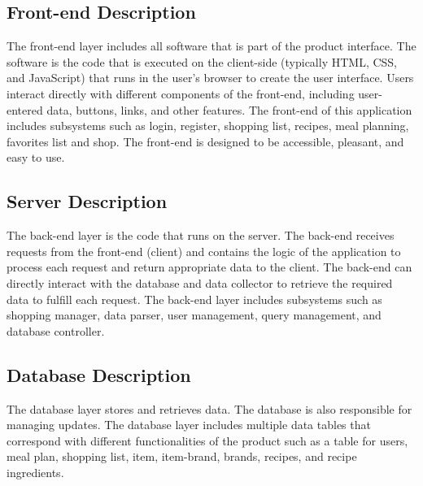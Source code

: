 \subsection{Front-end Description}
The front-end layer includes all software that is part of the product interface. The software is the code that is executed on the client-side (typically HTML, CSS, and JavaScript) that runs in the user's browser to create the user interface. Users interact directly with different components of the front-end, including user-entered data, buttons, links, and other features. The front-end of this application includes subsystems such as login, register, shopping list, recipes, meal planning, favorites list and shop. The front-end is designed to be accessible, pleasant, and easy to use.

\subsection{Server Description}
The back-end layer is the code that runs on the server. The back-end receives requests from the front-end (client) and contains the logic of the application to process each request and return appropriate data to the client. The back-end can directly interact with the database and data collector to retrieve the required data to fulfill each request. The back-end layer includes subsystems such as shopping manager, data parser, user management, query management, and database controller.

\subsection{Database Description}
The database layer stores and retrieves data. The database is also responsible for managing updates. The database layer includes multiple data tables that correspond with different functionalities of the product such as a table for users, meal plan, shopping list, item, item-brand, brands, recipes, and recipe ingredients.

